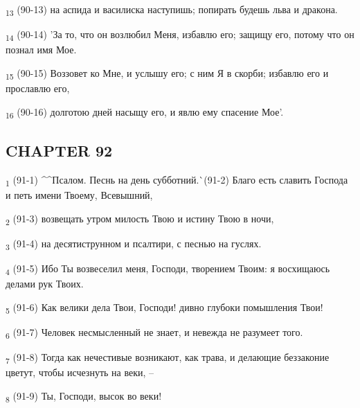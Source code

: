 \begin{tcolorbox}
\textsubscript{13} (90-13) на аспида и василиска наступишь; попирать будешь льва и дракона.
\end{tcolorbox}
\begin{tcolorbox}
\textsubscript{14} (90-14) 'За то, что он возлюбил Меня, избавлю его; защищу его, потому что он познал имя Мое.
\end{tcolorbox}
\begin{tcolorbox}
\textsubscript{15} (90-15) Воззовет ко Мне, и услышу его; с ним Я в скорби; избавлю его и прославлю его,
\end{tcolorbox}
\begin{tcolorbox}
\textsubscript{16} (90-16) долготою дней насыщу его, и явлю ему спасение Мое'.
\end{tcolorbox}
\subsection{CHAPTER 92}
\begin{tcolorbox}
\textsubscript{1} (91-1) ^^Псалом. Песнь на день субботний.^^ (91-2) Благо есть славить Господа и петь имени Твоему, Всевышний,
\end{tcolorbox}
\begin{tcolorbox}
\textsubscript{2} (91-3) возвещать утром милость Твою и истину Твою в ночи,
\end{tcolorbox}
\begin{tcolorbox}
\textsubscript{3} (91-4) на десятиструнном и псалтири, с песнью на гуслях.
\end{tcolorbox}
\begin{tcolorbox}
\textsubscript{4} (91-5) Ибо Ты возвеселил меня, Господи, творением Твоим: я восхищаюсь делами рук Твоих.
\end{tcolorbox}
\begin{tcolorbox}
\textsubscript{5} (91-6) Как велики дела Твои, Господи! дивно глубоки помышления Твои!
\end{tcolorbox}
\begin{tcolorbox}
\textsubscript{6} (91-7) Человек несмысленный не знает, и невежда не разумеет того.
\end{tcolorbox}
\begin{tcolorbox}
\textsubscript{7} (91-8) Тогда как нечестивые возникают, как трава, и делающие беззаконие цветут, чтобы исчезнуть на веки, --
\end{tcolorbox}
\begin{tcolorbox}
\textsubscript{8} (91-9) Ты, Господи, высок во веки!
\end{tcolorbox}
